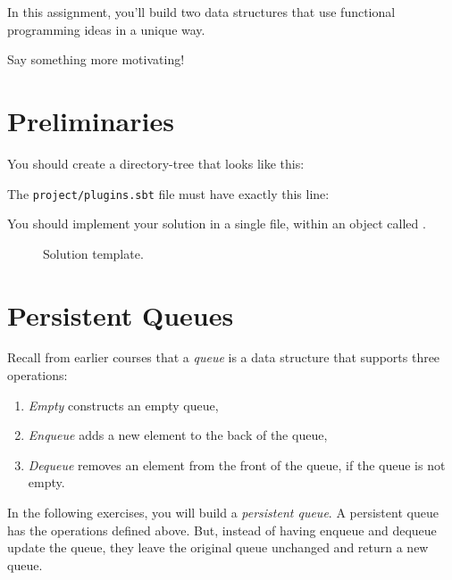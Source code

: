 
In this assignment, you'll build two data structures that use functional
programming ideas in a unique way.
\begin{instructor}
Say something more motivating!
\end{instructor}

\section{Preliminaries}

You should create a directory-tree that looks like this:


The \texttt{project/plugins.sbt} file must have exactly this line:


You should implement your solution in a single file, within an object called
.

\begin{figure}
\caption{Solution template.}
\end{figure}

\section{Persistent Queues}

Recall from earlier courses that a \emph{queue} is a data structure that
supports three operations:

\begin{enumerate}

\item \emph{Empty} constructs an empty queue,

\item \emph{Enqueue} adds a new element to the back of the queue,

\item \emph{Dequeue} removes an element from the front of the queue, if the queue is
  not empty.

\end{enumerate}

In the following exercises, you will build a \emph{persistent
queue}. A persistent queue has the operations defined above. But,
instead of having enqueue and dequeue update the queue, they leave the
original queue unchanged and return a new queue.

